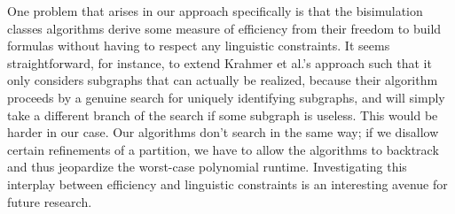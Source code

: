 One problem that arises in our approach specifically is that the
bisimulation classes algorithms derive some measure of efficiency from
their freedom to build formulas without having to respect any
linguistic constraints.  It seems straightforward, for instance, to
extend Krahmer et al.'s  approach such that it
only considers subgraphs that can actually be realized, because their
algorithm proceeds by a genuine search for uniquely identifying
subgraphs, and will simply take a different branch of the search if
some subgraph is useless.  This would be harder in our case.  Our
algorithms don't search in the same way; if we disallow certain
refinements of a partition, we have to allow the algorithms to
backtrack and thus jeopardize the worst-case polynomial runtime.
Investigating this interplay between efficiency and linguistic
constraints is an interesting avenue for future research.





